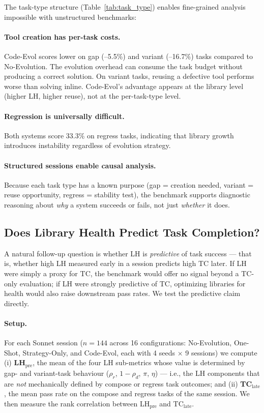 \documentclass[sigplan,nonacm,natbib=false]{acmart}
\begin{document}
The task-type structure (Table~\ref{tab:task_type}) enables fine-grained analysis impossible with unstructured benchmarks:

\paragraph{Tool creation has per-task costs.} Code-Evol scores lower on gap (--5.5\%) and variant (--16.7\%) tasks compared to No-Evolution. The evolution overhead can consume the task budget without producing a correct solution. On variant tasks, reusing a defective tool performs worse than solving inline. Code-Evol's advantage appears at the library level (higher LH, higher reuse), not at the per-task-type level.

\paragraph{Regression is universally difficult.} Both systems score 33.3\% on regress tasks, indicating that library growth introduces instability regardless of evolution strategy.

\paragraph{Structured sessions enable causal analysis.} Because each task type has a known purpose (gap = creation needed, variant = reuse opportunity, regress = stability test), the benchmark supports diagnostic reasoning about \emph{why} a system succeeds or fails, not just \emph{whether} it does.

\subsection{Does Library Health Predict Task Completion?}
\label{sec:predictive_validity}

A natural follow-up question is whether LH is \emph{predictive} of task success --- that is, whether high LH measured early in a session predicts high TC later. If LH were simply a proxy for TC, the benchmark would offer no signal beyond a TC-only evaluation; if LH were strongly predictive of TC, optimizing libraries for health would also raise downstream pass rates. We test the predictive claim directly.

\paragraph{Setup.} For each Sonnet session ($n = 144$ across 16 configurations: No-Evolution, One-Shot, Strategy-Only, and Code-Evol, each with 4 seeds $\times$ 9 sessions) we compute (i) \textbf{LH$_\text{pre}$}, the mean of the four LH sub-metrics whose value is determined by gap- and variant-task behaviour ($\rho_r$, $1-\rho_d$, $\pi$, $\eta$) --- i.e., the LH components that are \emph{not} mechanically defined by compose or regress task outcomes; and (ii) \textbf{TC$_\text{late}$}, the mean pass rate on the compose and regress tasks of the same session. We then measure the rank correlation between LH$_\text{pre}$ and TC$_\text{late}$.
\end{document}
